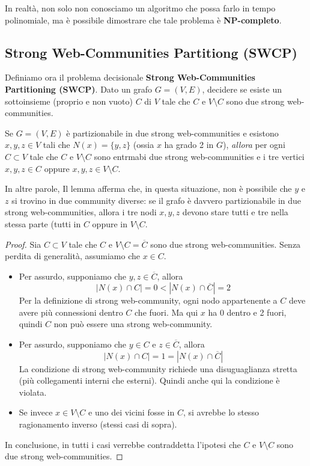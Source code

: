In realtà, non solo non conosciamo un algoritmo che possa farlo in tempo polinomiale, ma è possibile dimostrare che tale problema è \textbf{NP-completo}.

\subsection{Strong Web-Communities Partitiong (SWCP)}

Definiamo ora il problema decisionale \textbf{Strong Web-Communities Partitioning (SWCP)}. Dato un grafo $G = (V, E)$, decidere se esiste un sottoinsieme (proprio e non vuoto) $C$ di $V$ tale che $C$ e $V \setminus C$ sono due strong web-communities.

\begin{lemma}\label{lemma:swcp}
    Se $G=(V, E)$ è partizionabile in due strong web-communities e esistono $x, y, z \in V$ tali che $N(x) = \{y, z\}$ (ossia $x$ ha grado 2 in $G$), \textit{allora} per ogni $C \subset V$ tale che $C$ e $V \setminus C$ sono entrmabi due strong web-communities e i tre vertici $x, y, z \in C$ oppure $x, y, z \in V \setminus C$.
\end{lemma}
    In altre parole, Il lemma afferma che, in questa situazione, non è possibile che $y$ e $z$ si trovino in due community diverse: se il grafo è davvero partizionabile in due strong web-communities, allora i tre nodi $x,y,z$ devono stare tutti e tre nella stessa parte (tutti in $C$ oppure in $V \setminus C$.
\begin{proof}
    Sia $C \subset V$ tale che $C$ e $V \setminus C = \overline{C}$ sono due strong web-communities. Senza perdita di generalità, assumiamo che $x \in C$.
    \begin{itemize}
        \item Per assurdo, supponiamo che $y, z \in \overline{C}$, allora 
        \[
        |N(x) \cap C| = 0 < |N(x) \cap \overline{C}| = 2
        \]
        Per la definizione di strong web-community, ogni nodo appartenente a $C$ deve avere più connessioni dentro $C$ che fuori. Ma qui $x$ ha 0 dentro e 2 fuori, quindi $C$ non può essere una strong web-community.
        \item Per assurdo, supponiamo che $y \in C$ e $z \in \overline{C}$, allora
        \[
        |N(x) \cap C| = 1 = |N(x) \cap \overline{C}|
        \]
        La condizione di strong web-community richiede una disuguaglianza stretta (più collegamenti interni che esterni). Quindi anche qui la condizione è violata.
        \item Se invece $x \in V \setminus C$ e uno dei vicini fosse in $C$, si avrebbe lo stesso ragionamento inverso (stessi casi di sopra).
    \end{itemize}
    In conclusione, in tutti i casi verrebbe contraddetta l'ipotesi che $C$ e $V \setminus C$ sono due strong web-communities.
\end{proof}


